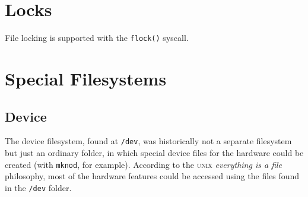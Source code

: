 \documentclass[a4paper]{article}
\begin{document}
\section{Locks}

File locking is supported with the \verb|flock()| syscall.


\section{Special Filesystems}


\subsection{Device}


The device filesystem, found at \verb|/dev|, was historically not a separate filesystem but just an ordinary folder, in which special device files for the hardware could be created (with \verb|mknod|, for example). According to the \textsc{unix} \emph{everything is a file} philosophy, most of the hardware features could be accessed using the files found in the \verb|/dev| folder.
\end{document}
